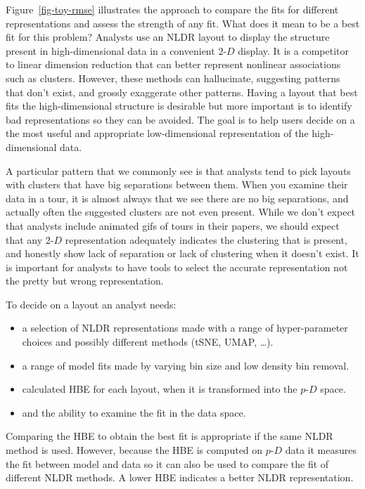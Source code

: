 \documentclass[
  11pt,
  a4paper,
]{report}
\providecommand{\tightlist}{%
  \setlength{\itemsep}{0pt}\setlength{\parskip}{0pt}}
\def\tightlist{}
\newcommand\pD{$p\text{-}D$}
\newcommand\gD{$2\text{-}D$}
\begin{document}
Figure~\ref{fig-toy-rmse} illustrates the approach to compare the fits
for different representations and assess the strength of any fit. What
does it mean to be a best fit for this problem? Analysts use an NLDR
layout to display the structure present in high-dimensional data in a
convenient \gD{} display. It is a competitor to linear dimension
reduction that can better represent nonlinear associations such as
clusters. However, these methods can hallucinate, suggesting patterns
that don't exist, and grossly exaggerate other patterns. Having a layout
that best fits the high-dimensional structure is desirable but more
important is to identify bad representations so they can be avoided. The
goal is to help users decide on a the most useful and appropriate
low-dimensional representation of the high-dimensional data.

A particular pattern that we commonly see is that analysts tend to pick
layouts with clusters that have big separations between them. When you
examine their data in a tour, it is almost always that we see there are
no big separations, and actually often the suggested clusters are not
even present. While we don't expect that analysts include animated gifs
of tours in their papers, we should expect that any \gD{} representation
adequately indicates the clustering that is present, and honestly show
lack of separation or lack of clustering when it doesn't exist. It is
important for analysts to have tools to select the accurate
representation not the pretty but wrong representation.

To decide on a layout an analyst needs:

\begin{itemize}
\tightlist
\item
  a selection of NLDR representations made with a range of
  hyper-parameter choices and possibly different methods (tSNE, UMAP,
  \ldots).
\item
  a range of model fits made by varying bin size and low density bin
  removal.
\item
  calculated HBE for each layout, when it is transformed into the \pD{}
  space.
\item
  and the ability to examine the fit in the data space.
\end{itemize}

Comparing the HBE to obtain the best fit is appropriate if the same NLDR
method is used. However, because the HBE is computed on \pD{} data it
measures the fit between model and data so it can also be used to
compare the fit of different NLDR methods. A lower HBE indicates a
better NLDR representation.
\end{document}
